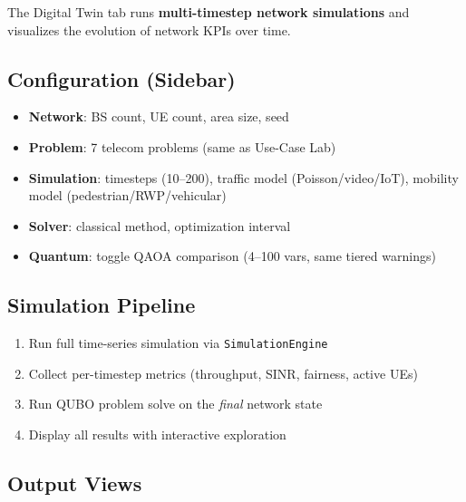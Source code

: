 \documentclass[11pt,a4paper]{article}
\begin{document}
The Digital Twin tab runs \textbf{multi-timestep network simulations} and visualizes the evolution of network KPIs over time.

\subsection{Configuration (Sidebar)}

\begin{itemize}
  \item \textbf{Network}: BS count, UE count, area size, seed
  \item \textbf{Problem}: 7 telecom problems (same as Use-Case Lab)
  \item \textbf{Simulation}: timesteps (10--200), traffic model (Poisson/video/IoT), mobility model (pedestrian/RWP/vehicular)
  \item \textbf{Solver}: classical method, optimization interval
  \item \textbf{Quantum}: toggle QAOA comparison (4--100 vars, same tiered warnings)
\end{itemize}

\subsection{Simulation Pipeline}

\begin{enumerate}
  \item Run full time-series simulation via \texttt{SimulationEngine}
  \item Collect per-timestep metrics (throughput, SINR, fairness, active UEs)
  \item Run QUBO problem solve on the \emph{final} network state
  \item Display all results with interactive exploration
\end{enumerate}

\subsection{Output Views}
\end{document}
